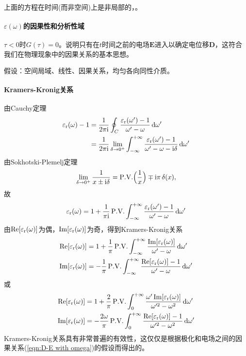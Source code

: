 上面的方程在时间(而非空间)上是非局部的，。
\paragraph{$\varepsilon(\omega)$的因果性和分析性域}
$\tau<0$时$G(\tau)=0$。说明只有在$t$时间之前的电场$\bm E$进入以确定电位移$\bm D$，这符合我们在物理现象中的因果关系的基本思想。

假设：空间局域、线性、因果关系，均匀各向同性介质。
\paragraph{Kramers-Kronig关系}
由Cauchy定理
\begin{align*}
    \varepsilon_\text r(\omega)-1&=\frac1{2\pi\mathrm{i}}\oint_C\frac{\varepsilon_\text r(\omega')-1}{\omega'-\omega}\mathop{}\!\mathrm{d}\omega'\\
    &=\frac1{2\pi\mathrm{i}}\lim_{\delta\to0^+}\int_{-\infty}^{+\infty}\frac{\varepsilon_\text r(\omega')-1}{\omega'-\omega-\mathrm{i}\delta}\mathop{}\!\mathrm{d}\omega'
\end{align*}
由Sokhotski-Plemelj定理
\[
    \lim_{\delta\to0^+}\frac1{x\pm\mathrm{i}\delta}=\mathrm{P.V.}\Bigl(\frac1x\Bigr)\mp\mathrm{i}\pi\mathop{}\!\delta(x),
\]
故
\[
    \varepsilon_\text r(\omega)=1+\frac1{\pi\mathrm{i}}\,\mathrm{P.V.}\int_{-\infty}^{+\infty}\frac{\varepsilon_\text r(\omega')-1}{\omega'-\omega}\mathop{}\!\mathrm{d}\omega'
\]
由$\operatorname{Re}[\varepsilon_\text r(\omega)]$为偶，$\operatorname{Im}[\varepsilon_\text r(\omega)]$为奇，得到Kramers-Kronig关系
\begin{equation}
    \begin{aligned}
        \operatorname{Re}[\varepsilon_\text r(\omega)]&=1+\frac1\pi\,\mathrm{P.V.}\int_{-\infty}^{+\infty}\frac{\operatorname{Im}[\varepsilon_\text r(\omega)]}{\omega'-\omega}\mathop{}\!\mathrm{d}\omega'\\
        \operatorname{Im}[\varepsilon_\text r(\omega)]&=-\frac1\pi\,\mathrm{P.V.}\int_{-\infty}^{+\infty}\frac{\operatorname{Re}[\varepsilon_\text r(\omega)]-1}{\omega'-\omega}\mathop{}\!\mathrm{d}\omega'\\
    \end{aligned}
\end{equation}
或
\begin{equation}
    \begin{aligned}
        \operatorname{Re}[\varepsilon_\text r(\omega)]&=1+\frac2\pi\,\mathrm{P.V.}\int_0^{+\infty}\frac{\omega'\operatorname{Im}[\varepsilon_\text r(\omega)]}{\omega'^2-\omega^2}\mathop{}\!\mathrm{d}\omega'\\
        \operatorname{Im}[\varepsilon_\text r(\omega)]&=-\frac{2\omega}\pi\,\mathrm{P.V.}\int_0^{+\infty}\frac{\operatorname{Re}[\varepsilon_\text r(\omega)]-1}{\omega'^2-\omega^2}\mathop{}\!\mathrm{d}\omega'\\
    \end{aligned}
\end{equation}
Kramers-Kronig关系具有非常普遍的有效性，这仅仅是根据极化和电场之间的因果关系(\ref{eqn:D-E with omega})的假设而得出的。

